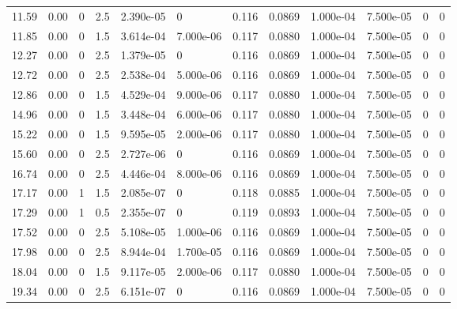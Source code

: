 \documentclass[preview]{standalone}
\begin{document}
{{\begin{tabular}{L{1.2cm}C{1.2cm} C{0.3cm}C{0.5cm} C{1.4cm}C{1.4cm} C{1.4cm}C{1.4cm} C{1.6cm}C{1.6cm} C{1.6cm}C{1.6cm}}
  11.59  &  0.00  & 0     & 2.5 &  2.390e-05  & 0  &  0.116&   0.0869& 1.000e-04 & 7.500e-05   &  0 & 0  \\ 
  11.85  &  0.00  & 0     & 1.5 &  3.614e-04  & 7.000e-06  &  0.117&   0.0880& 1.000e-04 & 7.500e-05   &  0 & 0  \\ 
  12.27  &  0.00  & 0     & 2.5 &  1.379e-05  & 0  &  0.116&   0.0869& 1.000e-04 & 7.500e-05   &  0 & 0  \\ 
  12.72  &  0.00  & 0     & 2.5 &  2.538e-04  & 5.000e-06  &  0.116&   0.0869& 1.000e-04 & 7.500e-05   &  0 & 0  \\ 
  12.86  &  0.00  & 0     & 1.5 &  4.529e-04  & 9.000e-06  &  0.117&   0.0880& 1.000e-04 & 7.500e-05   &  0 & 0  \\ 
  14.96  &  0.00  & 0     & 1.5 &  3.448e-04  & 6.000e-06  &  0.117&   0.0880& 1.000e-04 & 7.500e-05   &  0 & 0  \\ 
  15.22  &  0.00  & 0     & 1.5 &  9.595e-05  & 2.000e-06  &  0.117&   0.0880& 1.000e-04 & 7.500e-05   &  0 & 0  \\ 
  15.60  &  0.00  & 0     & 2.5 &  2.727e-06  & 0  &  0.116&   0.0869& 1.000e-04 & 7.500e-05   &  0 & 0  \\ 
  16.74  &  0.00  & 0     & 2.5 &  4.446e-04  & 8.000e-06  &  0.116&   0.0869& 1.000e-04 & 7.500e-05   &  0 & 0  \\ 
  17.17  &  0.00  & 1     & 1.5 &  2.085e-07  & 0  &  0.118&   0.0885& 1.000e-04 & 7.500e-05   &  0 & 0  \\ 
  17.29  &  0.00  & 1     & 0.5 &  2.355e-07  & 0  &  0.119&   0.0893& 1.000e-04 & 7.500e-05   &  0 & 0  \\ 
  17.52  &  0.00  & 0     & 2.5 &  5.108e-05  & 1.000e-06  &  0.116&   0.0869& 1.000e-04 & 7.500e-05   &  0 & 0  \\ 
  17.98  &  0.00  & 0     & 2.5 &  8.944e-04  & 1.700e-05  &  0.116&   0.0869& 1.000e-04 & 7.500e-05   &  0 & 0  \\ 
  18.04  &  0.00  & 0     & 1.5 &  9.117e-05  & 2.000e-06  &  0.117&   0.0880& 1.000e-04 & 7.500e-05   &  0 & 0  \\ 
  19.34  &  0.00  & 0     & 2.5 &  6.151e-07  & 0  &  0.116&   0.0869& 1.000e-04 & 7.500e-05   &  0 & 0  \\ 
\hline 
\end{tabular} 

}}
\end{document}

